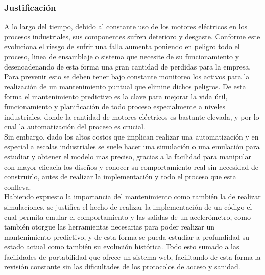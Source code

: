 
\subsubsection{Justificación}

A lo largo del tiempo, debido al constante uso de los motores eléctricos en los procesos industriales, sus componentes sufren deterioro y desgaste. Conforme este evoluciona el riesgo de sufrir una falla aumenta poniendo en peligro todo el proceso, linea de ensamblaje o sistema que necesite de su funcionamiento y desencadenando de esta forma una gran cantidad de perdidas para la empresa.\\
Para prevenir esto se deben tener bajo constante monitoreo los activos para la realización de un mantenimiento puntual que elimine dichos peligros. De esta forma el mantenimiento predictivo es la clave para mejorar la vida útil, funcionamiento y planificación de todo proceso especialmente a niveles industriales, donde la cantidad de motores eléctricos es bastante elevada, y por lo cual la automatización del proceso es crucial.\\

Sin embargo, dado los altos costos que implican realizar una automatización y en especial a escalas industriales se suele hacer una simulación o una emulación para estudiar y obtener el modelo mas preciso, gracias a la facilidad para manipular con mayor eficacia los diseños y conocer su comportamiento real sin necesidad de construirlo, antes de realizar la implementación y todo el proceso que esta conlleva.\\

Habiendo expuesto la importancia del mantenimiento como también la de realizar simulaciones, se justifica el hecho de realizar la implementación de un código el cual permita emular el comportamiento y las salidas de un acelerómetro, como también otorgue las herramientas necesarias para poder realizar un mantenimiento predictivo, y de esta forma se pueda estudiar a profundidad su estado actual como también su evolución histórica. Todo esto sumado a las facilidades de portabilidad que ofrece un sistema web, facilitando de esta forma la revisión constante sin las dificultades de los protocolos de acceso y sanidad.